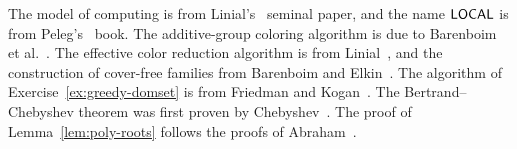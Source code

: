 The model of computing is from Linial's~\cite{linial92locality} seminal paper, and the name $\textup{\sffamily LOCAL}$ is from Peleg's~\cite{peleg00distributed} book. The additive-group coloring algorithm is due to Barenboim et al.\ \cite{barenboim18iterative}. The effective color reduction algorithm is from Linial~\cite{linial92locality}, and the construction of cover-free families from Barenboim and Elkin~\cite{barenboim13distributed}.
The algorithm of Exercise~\ref{ex:greedy-domset} is from Friedman and Kogan~\cite{friedman11deterministic}. The Bertrand--Chebyshev theorem was first proven by Chebyshev~\cite{chebyshev1852primes}. The proof of Lemma~\ref{lem:poly-roots} follows the proofs of Abraham~\cite{abraham2020polynomials}.

